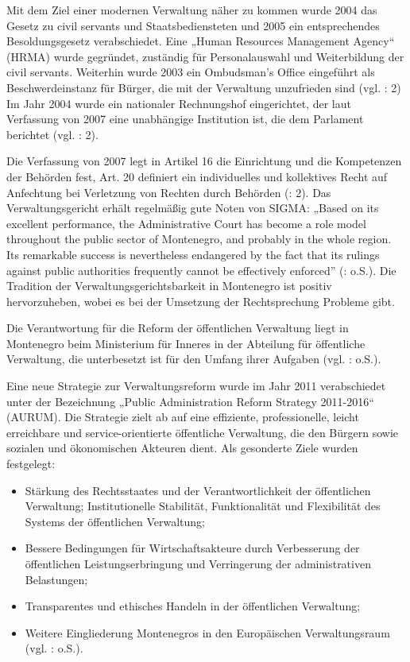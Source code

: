 Mit dem Ziel einer modernen Verwaltung näher zu kommen wurde 2004 das Gesetz zu civil servants und Staatsbediensteten und 2005 ein entsprechendes Besoldungsgesetz verabschiedet. Eine „Human Resources Management Agency“ (HRMA) wurde gegründet, zuständig für Personalauswahl und Weiterbildung der civil servants. Weiterhin wurde 2003 ein Ombudsman’s Office eingeführt als Beschwerdeinstanz für Bürger, die mit der Verwaltung unzufrieden sind (vgl. \cite{freund07}: 2) Im Jahr 2004 wurde ein nationaler Rechnungshof eingerichtet, der laut Verfassung von 2007 eine unabhängige Institution ist, die dem Parlament berichtet (vgl. \cite{oecd08b}: 2).\par
Die Verfassung von 2007 legt in Artikel 16 die Einrichtung und die Kompetenzen der Behörden fest, Art. 20 definiert ein individuelles und kollektives Recht auf Anfechtung bei Verletzung von Rechten durch Behörden (\cite{oecd08b}: 2). Das Verwaltungsgericht erhält regelmäßig gute Noten von SIGMA: „Based on its excellent performance, the Administrative Court has become a role model throughout the public sector of Montenegro, and probably in the whole region. Its remarkable success is nevertheless endangered by the fact that its rulings against public authorities frequently cannot be effectively enforced” (\cite{oecd11a}: o.S.). Die Tradition der Verwaltungsgerichtsbarkeit in Montenegro ist positiv hervorzuheben, wobei es bei der Umsetzung der Rechtsprechung Probleme gibt. \par
Die Verantwortung für die Reform der öffentlichen Verwaltung liegt in Montenegro beim Ministerium für Inneres in der Abteilung für öffentliche Verwaltung, die unterbesetzt ist für den Umfang ihrer Aufgaben (vgl. \cite{oecd11a}: o.S.).\par
Eine neue Strategie zur Verwaltungsreform wurde im Jahr 2011 verabschiedet unter der Bezeichnung „Public Administration Reform Strategy 2011-2016“ (AURUM). Die Strategie zielt ab auf eine effiziente, professionelle, leicht erreichbare und service-orientierte öffentliche Verwaltung, die den Bürgern sowie sozialen und ökonomischen Akteuren dient. Als gesonderte Ziele wurden festgelegt:
\begin{itemize} \itemsep1pt \parskip0pt 
\item Stärkung des Rechtsstaates und der Verantwortlichkeit der öffentlichen Verwaltung;
Institutionelle Stabilität, Funktionalität und Flexibilität des Systems der öffentlichen Verwaltung; 
\item Bessere Bedingungen für Wirtschaftsakteure durch Verbesserung der öffentlichen Leistungserbringung und Verringerung der administrativen Belastungen; 
\item Transparentes und ethisches Handeln in der öffentlichen Verwaltung; 
\item Weitere Eingliederung Montenegros in den Europäischen Verwaltungsraum (vgl. \cite{govmont11}: o.S.).
\end{itemize}


